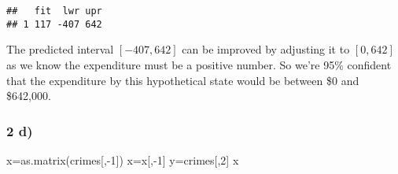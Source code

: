 \documentclass[
  11pt,
]{article}
\newenvironment{Shaded}{\begin{snugshade}}{\end{snugshade}}
\newcommand{\DecValTok}[1]{\textcolor[rgb]{0.00,0.00,0.81}{#1}}
\newcommand{\FunctionTok}[1]{\textcolor[rgb]{0.00,0.00,0.00}{#1}}
\newcommand{\NormalTok}[1]{#1}
\newcommand{\OtherTok}[1]{\textcolor[rgb]{0.56,0.35,0.01}{#1}}
\newcommand{\SpecialCharTok}[1]{\textcolor[rgb]{0.00,0.00,0.00}{#1}}
\begin{document}
\begin{verbatim}
##   fit  lwr upr
## 1 117 -407 642
\end{verbatim}

The predicted interval \([-407, 642]\) can be improved by adjusting it
to \([0, 642]\) as we know the expenditure must be a positive number. So
we're 95\% confident that the expenditure by this hypothetical state
would be between \$0 and \$642,000.

\hypertarget{d-1}{%
\subsubsection{2 d)}\label{d-1}}

\begin{Shaded}
\begin{Highlighting}[]
\NormalTok{x}\OtherTok{=}\FunctionTok{as.matrix}\NormalTok{(crimes[,}\SpecialCharTok{{-}}\DecValTok{1}\NormalTok{])}
\NormalTok{x}\OtherTok{=}\NormalTok{x[,}\SpecialCharTok{{-}}\DecValTok{1}\NormalTok{]}
\NormalTok{y}\OtherTok{=}\NormalTok{crimes[,}\DecValTok{2}\NormalTok{]}
\NormalTok{x}
\end{Highlighting}
\end{Shaded}
\end{document}

